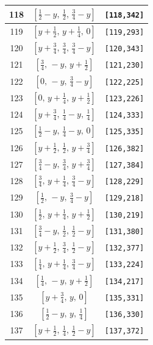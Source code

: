 \documentclass[fleqn,8pt]{jsarticle}
\begin{document}
\begin{longtable}{ccc}
118 & $\left[ \frac{1}{2} - y,\, \frac{1}{2},\, \frac{3}{4} - y \right]$ & {\tt [118,342]} \\ \hline
119 & $\left[ y + \frac{1}{2},\, y + \frac{1}{4},\, 0 \right]$ & {\tt [119,293]} \\ \hline
120 & $\left[ y + \frac{3}{4},\, \frac{3}{4},\, \frac{3}{4} - y \right]$ & {\tt [120,343]} \\ \hline
121 & $\left[ \frac{3}{4},\, - y,\, y + \frac{1}{2} \right]$ & {\tt [121,230]} \\ \hline
122 & $\left[ 0,\, - y,\, \frac{3}{4} - y \right]$ & {\tt [122,225]} \\ \hline
123 & $\left[ 0,\, y + \frac{1}{4},\, y + \frac{1}{2} \right]$ & {\tt [123,226]} \\ \hline
124 & $\left[ y + \frac{3}{4},\, \frac{1}{4} - y,\, \frac{1}{4} \right]$ & {\tt [124,333]} \\ \hline
125 & $\left[ \frac{1}{2} - y,\, \frac{1}{4} - y,\, 0 \right]$ & {\tt [125,335]} \\ \hline
126 & $\left[ y + \frac{1}{2},\, \frac{1}{2},\, y + \frac{3}{4} \right]$ & {\tt [126,382]} \\ \hline
127 & $\left[ \frac{3}{4} - y,\, \frac{3}{4},\, y + \frac{3}{4} \right]$ & {\tt [127,384]} \\ \hline
128 & $\left[ \frac{3}{4},\, y + \frac{1}{4},\, \frac{3}{4} - y \right]$ & {\tt [128,229]} \\ \hline
129 & $\left[ \frac{1}{2},\, - y,\, \frac{3}{4} - y \right]$ & {\tt [129,218]} \\ \hline
130 & $\left[ \frac{1}{2},\, y + \frac{1}{4},\, y + \frac{1}{2} \right]$ & {\tt [130,219]} \\ \hline
131 & $\left[ \frac{3}{4} - y,\, \frac{1}{2},\, \frac{1}{2} - y \right]$ & {\tt [131,380]} \\ \hline
132 & $\left[ y + \frac{1}{2},\, \frac{3}{4},\, \frac{1}{2} - y \right]$ & {\tt [132,377]} \\ \hline
133 & $\left[ \frac{1}{4},\, y + \frac{1}{4},\, \frac{3}{4} - y \right]$ & {\tt [133,224]} \\ \hline
134 & $\left[ \frac{1}{4},\, - y,\, y + \frac{1}{2} \right]$ & {\tt [134,217]} \\ \hline
135 & $\left[ y + \frac{3}{4},\, y,\, 0 \right]$ & {\tt [135,331]} \\ \hline
136 & $\left[ \frac{1}{2} - y,\, y,\, \frac{1}{4} \right]$ & {\tt [136,330]} \\ \hline
137 & $\left[ y + \frac{1}{2},\, \frac{1}{4},\, \frac{1}{2} - y \right]$ & {\tt [137,372]} \\ \hline

\end{longtable}
\end{document}
